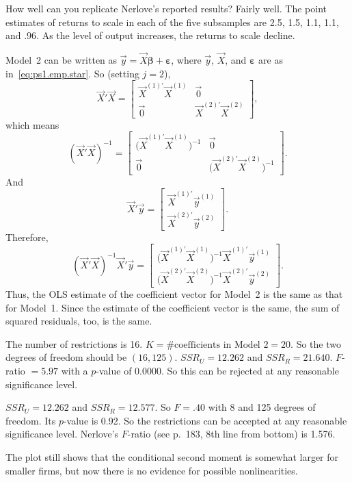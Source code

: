 \begin{answers}
\medskip

 How well can you replicate Nerlove's reported results? Fairly
well. The point estimates of returns to scale in each of the five subsamples
are 2.5, 1.5, 1.1, 1.1, and .96. As the level of output increases, the
returns to scale decline.

\medskip

 Model~2 can be written as $\vec{y} = \vec{X}\bm{\beta} + \bm{\varepsilon}$,
where $\vec{y}$, $\vec{X}$, and $\bm{\varepsilon}$ are as
in~\eqref{eq:ps1.emp.star}. So (setting $j = 2$),
%
\[
\vec{X}'\vec{X}
= \begin{bmatrix}
\vec{X}^{(1)\prime}\vec{X}^{(1)} & \vec{0} \\
\vec{0} & \vec{X}^{(2)\prime}\vec{X}^{(2)}
\end{bmatrix},
\]
%
which means
%
\[
(\vec{X}'\vec{X})^{-1}
= \begin{bmatrix}
\bigl(\vec{X}^{(1)\prime}\vec{X}^{(1)}\bigr)^{-1} & \vec{0} \\
\vec{0} & \bigl(\vec{X}^{(2)\prime}\vec{X}^{(2)}\bigr)^{-1}
\end{bmatrix}.
\]
%
And
%
\[
\vec{X}'\vec{y}
= \begin{bmatrix}
\vec{X}^{(1)\prime}\vec{y}^{(1)} \\
\vec{X}^{(2)\prime}\vec{y}^{(2)}
\end{bmatrix}.
\]
%
Therefore,
%
\[
(\vec{X}'\vec{X})^{-1}\vec{X}'\vec{y}
= \begin{bmatrix}
\bigl(\vec{X}^{(1)\prime}\vec{X}^{(1)}\bigr)^{-1}
\vec{X}^{(1)\prime}\vec{y}^{(1)} \\[4pt]
\bigl(\vec{X}^{(2)\prime}\vec{X}^{(2)}\bigr)^{-1}
\vec{X}^{(2)\prime}\vec{y}^{(2)}
\end{bmatrix}.
\]
%
Thus, the OLS estimate of the coefficient vector for Model~2 is the same as
that for Model~1. Since the estimate of the coefficient vector is the same,
the sum of squared residuals, too, is the same.

\medskip

 The number of restrictions is 16. $K = \text{\#coefficients in
Model~2} = 20$. So the two degrees of freedom should be $(16, 125)$.
$SSR_U = 12.262$ and $SSR_R = 21.640$. $F$-ratio $= 5.97$ with a $p$-value
of 0.0000. So this can be rejected at any reasonable significance level.

\medskip

 $SSR_U = 12.262$ and $SSR_R = 12.577$. So $F = .40$ with 8 and
125 degrees of freedom. Its $p$-value is 0.92. So the restrictions can be
accepted at any reasonable significance level. Nerlove's $F$-ratio (see
p.~183, 8th line from bottom) is 1.576.

\medskip

 The plot still shows that the conditional second moment is
somewhat larger for smaller firms, but now there is no evidence for possible
nonlinearities.

\end{answers}

